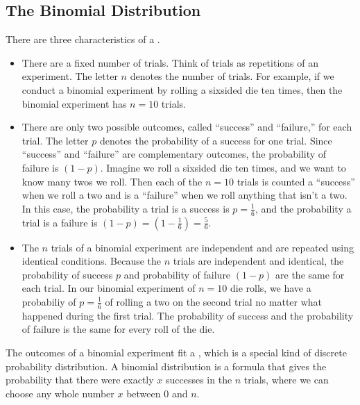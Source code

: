 \documentclass[letterpaper,10pt,english]{jupyterBook}
\begin{document}
\subsection{The Binomial Distribution}
\label{\detokenize{Ch3 Probability/3.6 The Binomial Distribution:id1}}
\sphinxAtStartPar
There are three characteristics of a .
\begin{itemize}
\item {} 
\sphinxAtStartPar
There are a fixed number of trials. Think of trials as repetitions of an experiment. The letter \(n\) denotes the number of trials.  For example, if we conduct a binomial experiment by rolling a six\sphinxhyphen{}sided die ten times, then the binomial experiment has \(n = 10\) trials.

\item {} 
\sphinxAtStartPar
There are only two possible outcomes, called “success” and “failure,” for each trial. The letter \(p\) denotes the probability of a success for one trial. Since “success” and “failure” are complementary outcomes, the probability of failure is \((1-p)\).  Imagine we roll a six\sphinxhyphen{}sided die ten times, and we want to know many twos we roll. Then each of the \(n = 10\) trials is counted a “success” when we roll a two and is a “failure” when we roll anything that isn’t a two. In this case, the probability a trial is a success is \(p = \frac{1}{6}\), and the probability a trial is a failure is \((1-p) = (1-\frac{1}{6}) = \frac{5}{6}\).

\item {} 
\sphinxAtStartPar
The \(n\) trials of a binomial experiment are independent and are repeated using identical conditions. Because the \(n\) trials are independent and identical, the probability of success \(p\) and probability of failure \((1-p)\) are the same for each trial.  In our binomial experiment of \(n = 10\) die rolls, we have a probabiliy of \(p = \frac{1}{6}\) of rolling a two on the second trial no matter what happened during the first trial. The probability of success and the probability of failure is the same for every roll of the die.

\end{itemize}

\sphinxAtStartPar
The outcomes of a binomial experiment fit a , which is a special kind of discrete probability distribution. A binomial distribution is a formula that gives the probability that there were exactly \(x\) successes in the \(n\) trials, where we can choose any whole number \(x\)  between \(0\) and \(n\).
\end{document}

